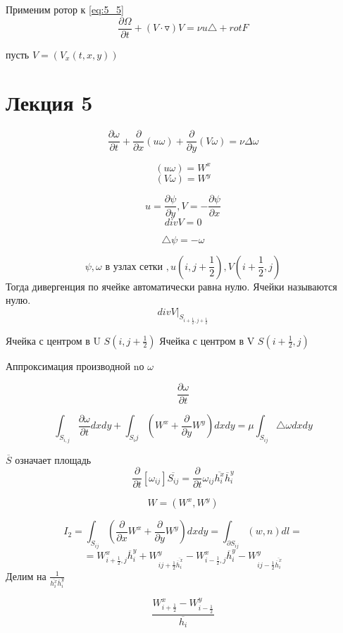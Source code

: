 \documentclass[12pt, a4paper]{article}
\begin{document}
Применим ротор к \ref{eq:5_5}
\begin{equation}\label{eq:5_6}
\frac{\partial \Omega}{\partial t} + (V \cdot \triangledown) V = \nu u \triangle + rot F 
\end{equation}

пусть $ V = (V_x(t,x, y)) $

\section{Лекция 5}

\[ \frac{\partial \omega}{ \partial t } + \frac{\partial}{\partial x} (u \omega) + \frac{\partial}{\partial y }(V \omega) = \nu  \Delta \omega\]

\[ (u \omega) = W^x \]
\[ (V \omega) = W^y \]

\[ u = \frac{\partial \psi}{\partial y}, V = -\frac{\partial \psi}{\partial x} \]
\[ div V = 0 \]

\[ \triangle \psi = -\omega \]

\[ \psi, \omega \textrm{ в узлах сетки }, u(i, j+\frac{1}{2}), V(i+\frac{1}{2}, j) \]
Тогда дивергенция по ячейке автоматически равна нулю. Ячейки называются нулю.
\[ div V|_{S_{i+\frac{1}{2}, j+\frac{1}{2}}} \]

Ячейка с центром в U $ S(i, j+\frac{1}{2}) $
Ячейка с центром в V $ S(i+\frac{1}{2}, j) $

Аппроксимация производной nо $ \omega $

\[ \frac{\partial \omega}{\partial t} \]

\[ \int_{S_{i,j}}^{} \frac{\partial\omega}{\partial t} dx dy + \int_{S_ij}^{}(W^x + \frac{\partial}{\partial y } W^y) dx dy = \mu \int_{S_{ij}}^{} \triangle \omega dx dy \]

$ \overline{S} $ означает площадь
\[ \frac{\partial}{\partial t} [\omega_{ij}] \overline{S_{ij}} = \frac{\partial}{\partial t} \omega_{ij} \overline{h_i^x} \overline{h}^y_i \]

\[ W = (W^x, W^y) \]

\[ I_2 = \int_{S_{ij}}^{} (\frac{\partial}{\partial x} W^x +\frac{\partial}{\partial y } W^y) dx dy = \int_{\partial S_{ij}}^{} (w, n )dl = \]
\[ = W^x_{i+\frac{1}{2}, j} \overline{h}^y_i + W^y_{ij+\frac{1}{2} \overline{\overline{h}^x_i}} - W^x_{i-\frac{1}{2}, j} \overline{h}^y_i - W^y_{ij-\frac{1}{2} \overline{\overline{h}^x_i}}\]
Делим на $ \frac{1}{\overline{h^x_i} \overline{h}^y_i} $

\[ \frac{W^x_{i+\frac{1}{2}} - W^y_{i-\frac{1}{2}}}{\overline{h_i}} \]
\end{document}
